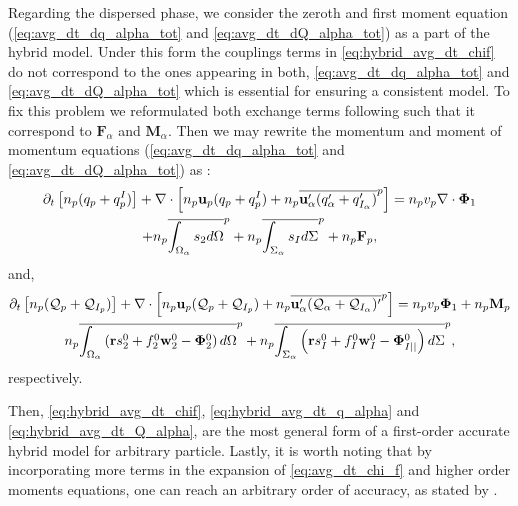 Regarding the dispersed phase, we consider the zeroth and first moment equation (\ref{eq:avg_dt_dq_alpha_tot} and \ref{eq:avg_dt_dQ_alpha_tot}) as  a part of the hybrid model.
Under this form the couplings terms in \ref{eq:hybrid_avg_dt_chif} do not correspond to the ones appearing in both, \ref{eq:avg_dt_dq_alpha_tot} and \ref{eq:avg_dt_dQ_alpha_tot} which is essential for ensuring a consistent model. 
To fix this problem we reformulated both exchange terms following \citet{zhang1997momentum} such that it correspond to $\mathbf{F}_\alpha$ and $\textbf{M}_\alpha$. 
Then we may rewrite the momentum and moment of momentum equations (\ref{eq:avg_dt_dq_alpha_tot} and \ref{eq:avg_dt_dQ_alpha_tot}) as : 
\begin{multline}
    \partial_t \left[n_p (q_p+q^I_p)\right]
    + \mathbf{\nabla}\cdot \left[n_p\textbf{u}_p
    (q_p+q^I_p)
    + n_p\overline{\textbf{u}_\alpha'(q_\alpha'+q_{I_\alpha}')}^{p} \right]
    = 
    n_p v_p  \mathbf{\nabla}\cdot \mathbf{\Phi}_1 \\
    + n_p\overline{\int_{\Omega_\alpha} s_2 d\Omega}^{p}
    + n_p\overline{\int_{\Sigma_\alpha} s_I d\Sigma}^{p}
    + n_p \textbf{F}_p,
    \label{eq:hybrid_avg_dt_q_alpha}
\end{multline}
and, 
\begin{multline}
    \partial_t \left[n_p (\mathcal{Q}_p+\mathcal{Q}_{I_p})\right]
    + \mathbf{\nabla}\cdot \left[
        n_p \textbf{u}_p (\mathcal{Q}_p+\mathcal{Q}_{I_p})
    + n_p\overline{\textbf{u}_\alpha'(\mathcal{Q}_\alpha+\mathcal{Q}_{I_\alpha})'}^{p}
    \right]
    =
    n_p v_p \mathbf{\Phi}_1 
    + n_p \textbf{M}_p\\
    n_p\overline{\int_{\Omega_\alpha} \left(
        \textbf{r} s_2^0         
        + f_2^0  \textbf{w}_2^0 
        - \mathbf{\Phi}_2^0
        \right) d\Omega}^{p}
        + n_p\overline{\int_{\Sigma_\alpha} \left(
        \textbf{r}s_I^0
        + f_I^0 \textbf{w}_I^0
        - \mathbf{\Phi}_{I||}^0
    \right) d\Sigma}^{p},
    \label{eq:hybrid_avg_dt_Q_alpha}
\end{multline}
respectively. 

Then, \ref{eq:hybrid_avg_dt_chif}, \ref{eq:hybrid_avg_dt_q_alpha} and \ref{eq:hybrid_avg_dt_Q_alpha}, are the most general form of a first-order accurate hybrid model for arbitrary particle. 
Lastly, it is worth noting that by incorporating more terms in the expansion of \ref{eq:avg_dt_chi_f} and higher order moments equations, one can reach an arbitrary order of accuracy, as stated by \citet{zhang1997momentum}. 

